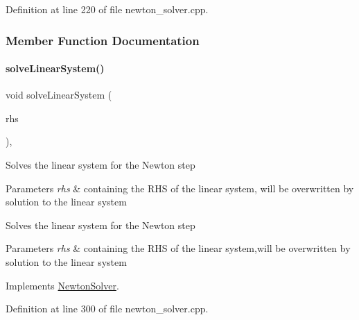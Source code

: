 Definition at line 220 of file newton\+\_\+solver.\+cpp.



\subsubsection{Member Function Documentation}
\mbox{\label{classamici_1_1_newton_solver_sparse_aa4a6695d71f00ec1b46e94b33e55660f}} 
\paragraph{\texorpdfstring{solveLinearSystem()}{solveLinearSystem()}}
{\footnotesize\ttfamily void solve\+Linear\+System (\begin{DoxyParamCaption}\item[{\mbox{\hyperlink{classamici_1_1_ami_vector}{Ami\+Vector}} $\ast$}]{rhs }\end{DoxyParamCaption})\hspace{0.3cm}{\ttfamily [override]}, {\ttfamily [virtual]}}

Solves the linear system for the Newton step


\begin{DoxyParams}{Parameters}
{\em rhs} & containing the R\+HS of the linear system, will be overwritten by solution to the linear system \\
\hline
\end{DoxyParams}
Solves the linear system for the Newton step


\begin{DoxyParams}{Parameters}
{\em rhs} & containing the R\+HS of the linear system,will be overwritten by solution to the linear system\\
\hline
\end{DoxyParams}


Implements \mbox{\hyperlink{classamici_1_1_newton_solver_a761a5dc9e8cc7adfd4a392421df17c3d}{Newton\+Solver}}.



Definition at line 300 of file newton\+\_\+solver.\+cpp.

